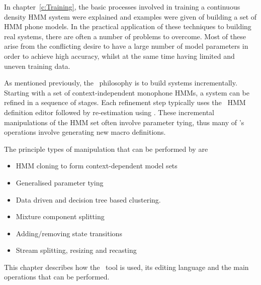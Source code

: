 %
%


In chapter~\ref{c:Training}, the basic processes involved in training
a continuous density HMM system were explained and examples were given
of building a set of HMM phone models.  In the practical application
of these techniques to building real systems, there are often a number of  
problems to overcome.  Most of these arise from the conflicting desire
to have a large number of model parameters in order to
achieve high accuracy, whilst at the same time having limited and uneven
training data. 

As mentioned previously,
the \HTK\ philosophy is to build systems incrementally.  Starting 
with a set of context-independent 
monophone HMMs, a system can be refined in a sequence of stages.  Each refinement
step typically uses the \HTK\ HMM definition editor  followed
by re-estimation using .  These incremental manipulations of
the HMM set often involve parameter tying, thus many of 's
operations involve generating new macro definitions.

The principle types of manipulation that can be performed 
by 
are 
\begin{itemize}
\item HMM cloning to form context-dependent model sets
\item Generalised parameter tying
\item Data driven and decision tree based clustering.
\item Mixture component splitting
\item Adding/removing state transitions
\item Stream splitting, resizing and recasting
\end{itemize}
This chapter describes how the \HTK\ tool  is used,  its
editing language and the main operations that can be
performed.

